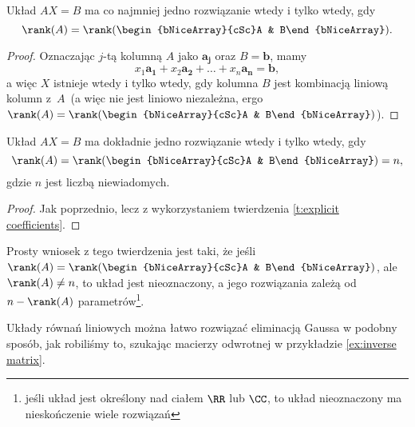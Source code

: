 \begin{theorem}
    \label{t:Kronecker-Cappelli}
    Układ $AX = B$ ma co najmniej jedno rozwiązanie wtedy i tylko wtedy, gdy
    \[ \rank(A) = \rank(\begin{bNiceArray}{cSc}A & B\end{bNiceArray}). \]
\end{theorem}
\begin{proof}
    Oznaczając $j$-tą kolumną $A$ jako $\mathbf{a_j}$ oraz $B = \mathbf{b}$, mamy
    \[ x_1\mathbf{a_1} + x_2\mathbf{a_2} + \ldots + x_n\mathbf{a_n} = \mathbf{b}, \]
    a więc $X$ istnieje wtedy i tylko wtedy, gdy kolumna $B$ jest kombinacją liniową kolumn z~$A$~(a więc nie jest liniowo niezależna, ergo $\rank(A) = \rank(\begin{bNiceArray}{cSc}A & B\end{bNiceArray})$).
\end{proof}

\begin{theorem}
    \label{t:rankA = rankA|B = n}
    Układ $AX = B$ ma dokładnie jedno rozwiązanie wtedy i tylko wtedy, gdy
    \[ \rank(A) = \rank(\begin{bNiceArray}{cSc}A & B\end{bNiceArray}) = n, \]
    gdzie $n$ jest liczbą niewiadomych.
\end{theorem}
\begin{proof}
    Jak poprzednio, lecz z wykorzystaniem twierdzenia \ref{t:explicit coefficients}.
\end{proof}

Prosty wniosek z tego twierdzenia jest taki, że jeśli $\rank(A) = \rank(\begin{bNiceArray}{cSc}A & B\end{bNiceArray})$, ale $\rank(A) \neq n$, to układ jest nieoznaczony, a jego rozwiązania zależą od $n - \rank(A)$ parametrów\footnote{jeśli układ jest określony nad ciałem $\RR$ lub $\CC$, to układ nieoznaczony ma nieskończenie wiele rozwiązań}.

Układy równań liniowych można łatwo rozwiązać eliminacją Gaussa w podobny sposób, jak robiliśmy to, szukając macierzy odwrotnej w przykładzie \ref{ex:inverse matrix}.

